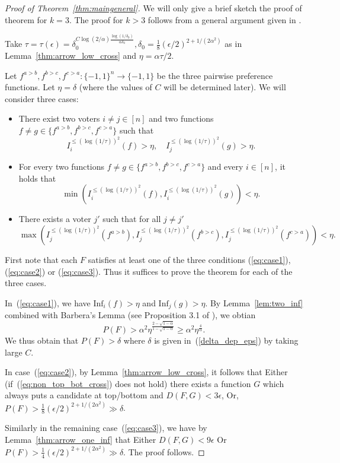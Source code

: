 \documentclass[11pt]{amsart}
\newcommand{\eps}{\epsilon}
\newcommand{\1}{\mathbf{1}}
\newcommand{\I}{\mathrm{Inf}}
\theoremstyle{definition}
\theoremstyle{plain}
\theoremstyle{remark}
\numberwithin{equation}{section}
\begin{document}
\begin{proof}[Proof of Theorem~\ref{thm:maingeneral}]
 We will only give a brief sketch the proof of theorem for $k=3$. The proof for $k > 3$  follows from a general argument given in \cite{Mossel11}.

 Take $\tau = \tau(\eps) = \delta_0^{C \log (2/\alpha) \frac{\log(1/\delta_0)}{ \alpha \delta_0 }}, \delta_0= \frac{1}{8}(\eps/2)^{2+1/(2 \alpha^2)}$ as in Lemma~\ref{thm:arrow_low_cross}  and $\eta = \alpha \tau/2$.

Let $f^{a>b},f^{b>c},f^{c>a} : \{-1,1\}^n \to \{-1,1\}$ be the three pairwise preference functions.
Let $\eta = \delta$ (where the values of $C$ will be determined later).
We will consider three cases:
\begin{itemize}
\item
There exist two voters $i \neq j \in [n]$ and two functions $f \neq g \in \{f^{a>b},f^{b>c},f^{c>a}\}$ such that
\begin{equation} \label{eq:case1}
I^ { \le (\log(1/\tau))^2}_i(f) > \eta, \quad I^ { \le (\log(1/\tau))^2}_j(g) > \eta.
\end{equation}
\item
For every two functions $f \neq g \in \{f^{a>b},f^{b>c},f^{c>a}\}$ and every $i \in [n]$, it holds that
\begin{equation} \label{eq:case2}
\min(I^ { \le (\log(1/\tau))^2}_i(f),I^ { \le (\log(1/\tau))^2}_i(g)) < \eta.
\end{equation}
\item
There exists a voter $j'$ such that for all $j \neq j'$
\begin{equation} \label{eq:case3}
\max(I^ { \le (\log(1/\tau))^2}_j(f^{a>b}),I^ { \le (\log(1/\tau))^2}_j(f^{b>c}),I^ { \le (\log(1/\tau))^2}_j(f^{c>a})) < \eta.
\end{equation}
\end{itemize}

First note that each $F$ satisfies at least one of the three conditions (\ref{eq:case1}), (\ref{eq:case2})
or (\ref{eq:case3}). Thus it suffices to prove the theorem for each of the three cases.

In~(\ref{eq:case1}), we have $\I_i(f) > \eta $ and $ \I_j(g) > \eta$. By Lemma~\ref{lem:two_inf} combined with Barbera's Lemma \cite{barbera80} (see Proposition 3.1 of \cite{Mossel11}), we obtian
\[
P(F) > \alpha^2 \eta^{\frac{2- \sqrt{1-\alpha}}{1 - \sqrt{1-\alpha}}} \ge  \alpha^2 \eta^{\frac{4}{\alpha}} .
\]
We thus obtain that $P(F) > \delta$ where $\delta$ is given in~(\ref{delta_dep_eps})
by taking large $C$.

In case~(\ref{eq:case2}), by Lemma~\ref{thm:arrow_low_cross}, it follows that Either (if~(\ref{eq:non_top_bot_cross}) does not hold) there exists a function $G$ which
always puts a candidate at top/bottom and $D(F,G) < 3\eps$, Or,
$P(F) >  \frac{1}{8}(\eps/2)^{2+1/(2 \alpha^2)} \gg \delta$.

Similarly in the remaining case~(\ref{eq:case3}), we have by Lemma~\ref{thm:arrow_one_inf} that Either $D(F,G) < 9\eps$ Or
$P(F) > \frac{1}{4}(\eps/2)^{2+1/(2 \alpha^2)} \gg \delta$. The proof follows.
\end{proof}
\end{document}
